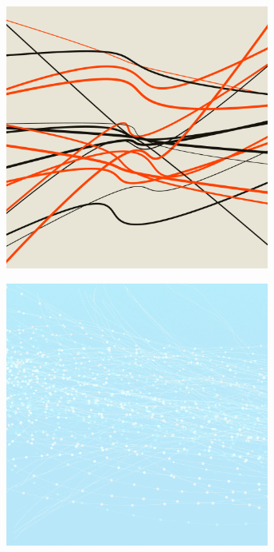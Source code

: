 \documentclass[11pt,twoside]{book}
\begin{document}
\begin{figure}[!ht]
\includegraphics[width=246pt]{contructivist-real-17065e6b-cbe3-403b-acb4-58d5f267117b.png}
\end{figure}
\newpage
{}
\fancyfoot[CE,CO]{\fontsize{10}{12}\selectfont \thepage}
\begin{figure}[!ht]
\includegraphics[width=246pt]{blizzard-7d8e21ed-8ae9-4eb0-b18c-8ebb89d6e51f.png}
\end{figure}
\newpage
{}
\fancyfoot[CE,CO]{\fontsize{10}{12}\selectfont \thepage}
\end{document}
